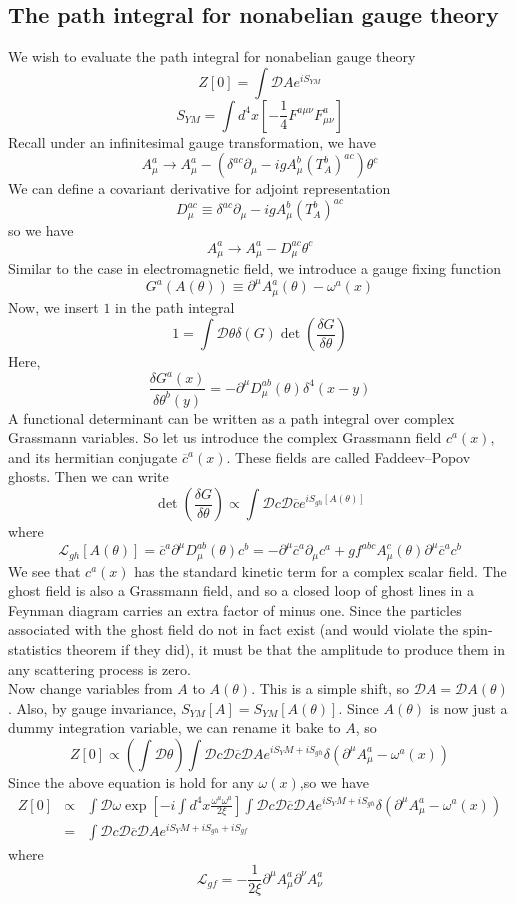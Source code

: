 \documentclass[cyan]{elegantnote}
\begin{document}
\subsection{The path integral for nonabelian gauge theory}
We wish to evaluate the path integral for nonabelian gauge theory
\[Z[0] = \int \mathcal{D}A e^{iS_{YM}}\]
\[S_{YM} = \int d^4x \left[-\frac{1}{4}F^{a\mu\nu}F^{a}_{\mu\nu} \right]\]
Recall under an infinitesimal gauge transformation, we have
\[A^{a}_{\mu} \to A^{a}_{\mu} -(\delta^{ac}\partial_{\mu}-igA^{b}_{\mu}(T_{A}^{b})^{ac})\theta^c\]
We can define a covariant derivative for adjoint representation
\[D_{\mu}^{ac} \equiv \delta^{ac}\partial_{\mu}-igA^{b}_{\mu}(T_{A}^{b})^{ac}\]
so we have
\[A^{a}_{\mu} \to A^{a}_{\mu} - D_{\mu}^{ac}\theta^c\]
Similar to the case in electromagnetic field, we introduce a gauge fixing function
\[G^a(A(\theta)) \equiv \partial^{\mu}A^a_{\mu}(\theta)  - \omega^a(x)\]
Now, we insert $1$ in the path integral
\[1 = \int \mathcal{D}\theta \delta(G) \det\left( \frac{\delta G}{\delta \theta} \right)\]
Here,
\[\frac{\delta G^a(x)}{\delta \theta^b(y)} = -\partial^{\mu}D_{\mu}^{ab}(\theta)\delta^4(x-y)\]
A functional determinant can be written as a path integral over complex Grassmann variables. So let us introduce the complex Grassmann field $c^a(x)$, and its hermitian conjugate $\overline{c}^a(x)$. These fields are called Faddeev–Popov ghosts. Then we can write
\[ \det\left( \frac{\delta G}{\delta \theta} \right) \propto \int \mathcal{D}c \mathcal{D}\overline{c} e^{iS_{gh}[A(\theta)]}\]
where
\[\mathcal{L}_{gh}[A(\theta)] = \overline{c}^a \partial^{\mu}D^{ab}_{\mu}(\theta)c^b = -\partial^{\mu}\overline{c}^a \partial_{\mu}c^a + gf^{abc}A^c_{\mu}(\theta)\partial^{\mu}\overline{c}^a c^b\]
We see that $c^a(x)$ has the standard kinetic term for a complex scalar field.  The ghost field is also a Grassmann field, and so a closed loop of ghost lines in a Feynman diagram carries an extra factor of minus one. Since the particles associated with the ghost field do not in fact exist (and would violate the spin-statistics theorem if they did), it must be that the amplitude to produce them in any scattering process is zero.
\\
Now change variables from $A$ to $A(\theta)$. This is a simple shift, so $\mathcal{D}A = \mathcal{D}A(\theta)$. Also, by gauge invariance, $S_{YM}[A] = S_{YM}[A(\theta)]$. Since $A(\theta)$ is now just a dummy integration variable, we can rename it bake to $A$, so
\[Z[0] \propto \left(\int \mathcal{D}\theta\right) \int \mathcal{D}c \mathcal{D}\overline{c} \mathcal{D}A e^{iS_YM + iS_{gh}} \delta(\partial^{\mu}A^a_{\mu}-\omega^a(x))\]
Since the above equation is hold for any $\omega(x)$,so we have
\begin{eqnarray}
Z[0] &\propto& \int \mathcal{D}\omega \exp \left[-i\int d^4x \frac{\omega^a\omega^a}{2\xi} \right] \int \mathcal{D}c \mathcal{D}\overline{c} \mathcal{D}A e^{iS_YM + iS_{gh}} \delta(\partial^{\mu}A^a_{\mu}-\omega^a(x)) \nonumber \\
&=&  \int \mathcal{D}c \mathcal{D}\overline{c} \mathcal{D}A e^{iS_YM + iS_{gh} + iS_{gf}}
\end{eqnarray}
where
\[\mathcal{L}_{gf} = -\frac{1}{2\xi}\partial^{\mu}A^a_{\mu} \partial^{\nu}A^a_{\nu}\]
\end{document}
